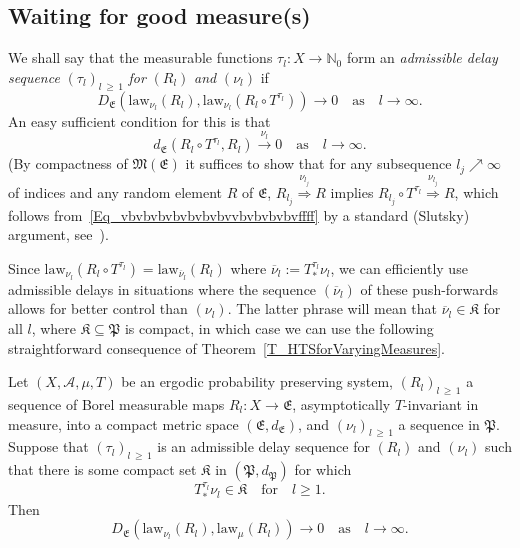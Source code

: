 \documentclass[AHL,Unicode,longabstracts]{cedram}
\newcommand{\clA}{\mathcal{A}}
\newcommand{\law}{\mathrm{law}}
\newcommand{\frkK}{\mathfrak{K}}
\newcommand{\frkP}{\mathfrak{P}}
\newcommand{\frkE}{\mathfrak{E}}
\newcommand{\frkM}{\mathfrak{M}}
\newcommand{\bbN}{\mathbb{N}}
\begin{document}
\subsection{Waiting for good measure(s)}
We shall say that the measurable functions $\tau_{l}:X\rightarrow\bbN_{0}$ form an \emph{admissible delay sequence} $(\tau_{l})_{l\,\geq\,1}$ \emph{for} $(R_{l})$ \emph{and} $(\nu_{l})$ if
\begin{equation}
D_{\frkE}\left(\law_{\nu_{l}}(R_{l}),\law_{\nu_{l}} \left(R_{l}\circ T^{\tau_{l}}\right)\right)\longrightarrow0\quad\text{as}\quad l\rightarrow
\infty.
\end{equation}
An easy sufficient condition for this is that
\begin{equation}\label{Eq_vbvbvbvbvbvbvbvvbvbvbvbvffff}
d_{\frkE}(R_{l}\circ T^{\tau_{l}},R_{l})\overset{\nu_{l}} {\longrightarrow}0\quad \text{as}\quad l\rightarrow\infty.
\end{equation}
(By compactness of $\frkM(\frkE)$ it suffices to show that for any subsequence $l_{j}\nearrow\infty$ of indices and any random element $R$ of $\frkE$, $R_{l_{j}}\overset{\nu_{l_{j}}}{\Longrightarrow}R$ implies $R_{l_{j}}\circ T^{\tau_{l}}\overset{\nu_{l_{j}}}{\Longrightarrow}R$, which follows from~\eqref{Eq_vbvbvbvbvbvbvbvvbvbvbvbvffff} by a standard (Slutsky) argument, see~\cite[Theorem~3.1]{Bi}).

Since $\law_{\nu_{l}}(R_{l}\circ T^{\tau_{l}})=\law _{\overline{\nu}_{l}}(R_{l})$ where $\overline{\nu}_{l}:=T_{\ast}^{\tau_{l} }\nu_{l}$, we can efficiently use admissible delays in situations where the sequence $(\overline{\nu}_{l})$ of these push-forwards allows for better control than $(\nu_{l})$. The latter phrase will mean that $\overline{\nu} _{l}\in\frkK$ for all $l$, where $\frkK\subseteq\frkP$ is compact, in which case we can use the following straightforward consequence of Theorem~\ref{T_HTSforVaryingMeasures}.

\begin{prop}\label{P_AsyInvarSeqNuLVsMu}
Let $(X,\clA,\mu,T)$ be an ergodic probability preserving system, $(R_{l})_{l\,\geq\,1}$ a sequence of Borel measurable maps $R_{l}:X\rightarrow\frkE$, asymptotically $T$-invariant in measure, into a compact metric space $(\frkE,d_{\frkE})$, and $(\nu_{l})_{l\,\geq\,1}$ a sequence in $\frkP$. Suppose that $(\tau _{l})_{l\,\geq\,1}$ is an admissible delay sequence for $(R_{l})$ and $(\nu_{l})$ such that there is some compact set $\frkK$ in $(\frkP,d_{\frkP})$ for which
\begin{equation}
T_{\ast}^{\tau_{l}}\nu_{l}\in\frkK\quad \text{for}\quad l\geq1.
\end{equation}
Then
\begin{equation}
D_{\frkE}\left(\law_{\nu_{l}}(R_{l}),\law_{\mu} (R_{l})\right)\longrightarrow0\quad\text{as}\quad l\rightarrow\infty .
\end{equation}
\end{prop}
\end{document}
